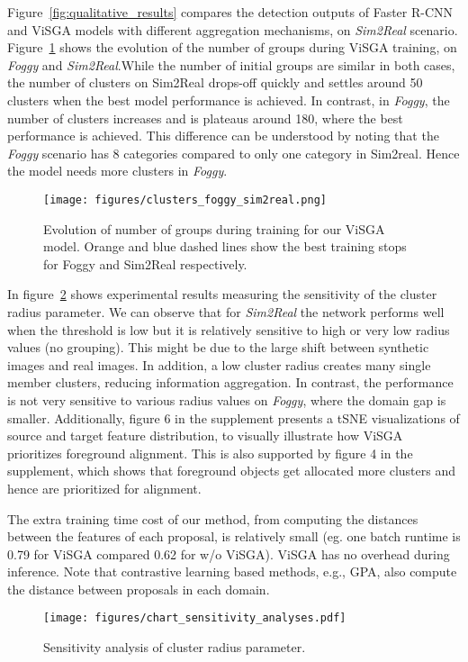 \documentclass[10pt,twocolumn,letterpaper]{article}
\DeclareRobustCommand{\Figref}[1]{Figure~\ref{#1}}
\def\ourda{ViSGA\xspace}
\begin{document}
\myparagraph{Qualitative analysis of \ourda.} 
\Figref{fig:qualitative_results} compares the detection outputs of Faster R-CNN and \ourda models with different aggregation mechanisms, on \emph{Sim2Real} scenario. 
\Figref{fig:cluster_analysis} shows the evolution of the number of groups during \ourda training, on \emph{Foggy} and \emph{Sim2Real}.While the number of initial groups are similar in both cases, the number of clusters on Sim2Real drops-off quickly and settles around 50 clusters when the best model performance is achieved.
In contrast, in \emph{Foggy}, the number of clusters increases and is plateaus around 180, where the best performance is achieved. 
This difference can be understood by noting that the \emph{Foggy} scenario has 8 categories compared to only one category in Sim2real. 
Hence the model needs more clusters in \emph{Foggy}.\begin{figure}[t]
	\centering
	\texttt{[image: figures/clusters\_foggy\_sim2real.png]}
	\caption{Evolution of number of groups during training for our \ourda model. Orange and blue dashed lines show the best training stops for Foggy and Sim2Real respectively. } 
\label{fig:cluster_analysis}
	\vspace{0mm}
\end{figure}
In figure~\ref{sensitivity_analysis} shows experimental results measuring the sensitivity of the cluster radius parameter. We can observe that for \emph{Sim2Real} the network performs well when the threshold is low but it is relatively sensitive to high or very low radius values (no grouping). 
This might be due to the large shift between synthetic images and real images. 
In addition, a low cluster radius creates many single member clusters, reducing information aggregation. 
In contrast, the performance is not very sensitive to various radius values on \emph{Foggy}, where the domain gap is smaller. 
Additionally, figure 6 in the supplement presents a tSNE  \cite{van2008visualizing} visualizations of source and target feature distribution, to visually illustrate how \ourda prioritizes foreground alignment. This is also supported by figure 4 in the supplement, which shows that foreground objects get allocated more clusters and hence are prioritized for alignment.

 The extra training time cost of our method, from computing the distances between the features of each proposal, is relatively small (eg.  one batch runtime is 0.79 for \ourda compared 0.62 for w/o \ourda). \ourda has no overhead during inference. Note that contrastive learning based methods, e.g., GPA, also compute the distance between proposals in each domain.
\begin{figure}
	\centering
	\texttt{[image: figures/chart\_sensitivity\_analyses.pdf]}
	\caption{Sensitivity analysis of cluster radius parameter.}
\label{sensitivity_analysis}
	\vspace{-2mm}
\end{figure}
\end{document}
